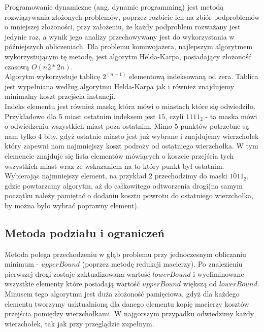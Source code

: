 \documentclass{article}
\begin{document}
Programowanie dynamiczne (ang. dynamic programming) jest metodą rozwiązywania złożonych
problemów, poprzez rozbicie ich na zbiór podproblemów o mniejszej złożoności, przy założeniu, że
każdy podproblem rozważany jest jedynie raz, a wynik jego analizy przechowywany jest do
wykorzystania w późniejszych obliczeniach. Dla problemu komiwojażera, najlepszym algorytmem
wykorzystującym tę metodę, jest algorytm Helda-Karpa, posiadający złożoność czasową $O(n2 * 2n)$.\\

Algorytm wykorzystuje tablicę $2^{(n-1)}$ elementową indeksowaną od zera. Tablica jest wypełniana według algorytmu Helda-Karpa jak i również znajdujemy minimalny koszt przejścia instancji.\\ Indeks elementu jest również maską która mówi o miastach które się odwiedziło. Przykładowo dla 5 miast ostatnim indeksem jest $15$, czyli $1111_{2}$ - ta maska mówi o odwiedzeniu wszystkich miast poza ostatnim. Mimo 5 punktów potrzebne są nam tylko 4 bity, gdyż ostatnie miasto jest już wybrane i znajdujemy wierzchołek który zapewni nam najmniejszy koszt podroży od ostatniego wierzchołka. W tym elemencie znajduje się lista elementów mówiących o koszcie przejścia tych wszystkich miast wraz ze wskazaniem na to który punkt był ostatnim. Wybierając najmniejszy element, na przykład $2$ przechodzimy do maski $1011_{2}$, gdzie powtarzamy algorytm, aż do całkowitego odtworzenia drogi(na samym początku należy pamiętać o dodaniu kosztu powrotu do ostatniego wierzchołka, by można było wybrać poprawny element). 

\subsection{Metoda podziału i ograniczeń}

Metoda polega przechodzeniu w głąb problemu przy jednoczesnym obliczaniu minimum - $upperBound$ (poprzez metodę redukcji macierzy). Po znalezieniu pierwszej drogi zostaje zaktualizowana wartość $lowerBound$ i wyeliminowane wszystkie elementy które posiadają wartość $upperBound$ większą od $lowerBound$. Minusem tego algorytmu jest duża złożoność pamięciowa, gdyż dla każdego elementu tworzymy uaktualnioną dla danego elementu kopię macierzy kosztów przejścia pomiędzy wierzchołkami. W najgorszym przypadku odwiedzimy każdy wierzchołek, tak jak przy przeglądzie zupełnym.\\\\\\\\\\\\\\\\\\
\end{document}
